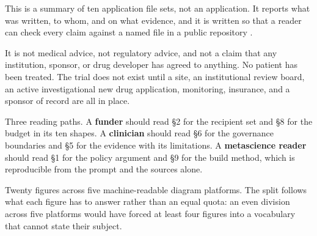 This is a summary of ten application file sets, not an application. It reports
what was written, to whom, and on what evidence, and it is written so that a
reader can check every claim against a named file in a public repository
\cite{repo2026}.

It is not medical advice, not regulatory advice, and not a claim that any
institution, sponsor, or drug developer has agreed to anything. No patient has
been treated. The trial does not exist until a site, an institutional review
board, an active investigational new drug application, monitoring, insurance,
and a sponsor of record are all in place.

Three reading paths. A \textbf{funder} should read \S2 for the recipient set and
\S8 for the budget in its ten shapes. A \textbf{clinician} should read \S6 for
the governance boundaries and \S5 for the evidence with its limitations. A
\textbf{metascience reader} should read \S1 for the policy argument and \S9 for
the build method, which is reproducible from the prompt and the sources alone.


Twenty figures across five machine-readable diagram platforms. The split follows
what each figure has to answer rather than an equal quota: an even division
across five platforms would have forced at least four figures into a vocabulary
that cannot state their subject.

